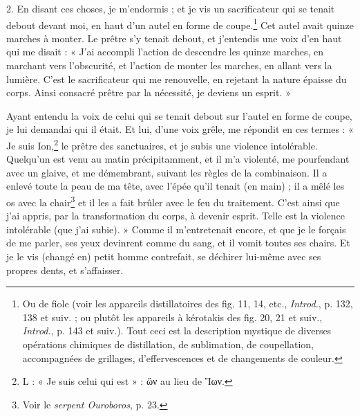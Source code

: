 \documentclass[landscape, a4paper, 11pt, oneside, polutonikogreek, french]{article}
\begin{document}
2. En disant ces choses, je m'endormis ; et je vis un sacrificateur qui se tenait debout devant moi, en haut d'un autel en forme de coupe.\footnote{Ou de fiole (voir les appareils distillatoires des fig. 11, 14, etc., \emph{Introd.}, p. 132, 138 et suiv. ; ou plutôt les appareils à kérotakis des fig. 20, 21 et suiv., \emph{Introd.}, p. 143 et suiv.). Tout ceci est la description mystique de diverses opérations chimiques de distillation, de sublimation, de coupellation, accompagnées de grillages, d'effervescences et de changements de couleur.} Cet autel avait quinze marches à monter. Le prêtre s'y tenait debout, et j'entendis une voix d'en haut qui me disait : « J'ai accompli l'action de descendre les quinze marches, en marchant vers l'obscurité, et l'action de monter les marches, en allant vers la lumière. C'est le sacrificateur qui me renouvelle, en rejetant la nature épaisse du corps. Ainsi consacré prêtre par la nécessité, je deviens un esprit. »

Ayant entendu la voix de celui qui se tenait debout sur l'autel en forme de coupe, je lui demandai qui il était. Et lui, d'une voix grêle, me répondit en ces termes : « Je suis Ion,\footnote{L : « Je suis celui qui est » : ὢν au lieu de Ἴων.} le prêtre des sanctuaires, et je subis une violence intolérable. Quelqu'un est venu au matin précipitamment, et il m'a violenté, me pourfendant avec un glaive, et me démembrant, suivant les règles de la combinaison. Il a enlevé toute la peau de ma tête, avec l'épée qu'il tenait (en main) ; il a mêlé les os avec la chair\footnote{Voir le \emph{serpent Ouroboros}, p. 23.} et il les a fait brûler avec le feu du traitement. C'est ainsi que j'ai appris, par la transformation du corps, à devenir esprit. Telle est la violence intolérable (que j'ai subie). » Comme il m'entretenait encore, et que je le forçais de me parler, ses yeux devinrent comme du sang, et il vomit toutes ses chairs. Et je le vis (changé en) petit homme contrefait, se déchirer lui-même avec ses propres dents, et s'affaisser.
\end{document}
